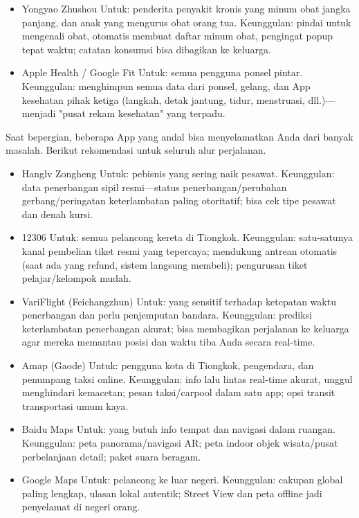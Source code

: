 
\begin{itemize}
  \item Yongyao Zhushou Untuk: penderita penyakit kronis yang minum obat jangka panjang, dan anak yang mengurus obat orang tua. Keunggulan: pindai untuk mengenali obat, otomatis membuat daftar minum obat, pengingat popup tepat waktu; catatan konsumsi bisa dibagikan ke keluarga.
\end{itemize}


\begin{itemize}
  \item Apple Health / Google Fit Untuk: semua pengguna ponsel pintar. Keunggulan: menghimpun semua data dari ponsel, gelang, dan App kesehatan pihak ketiga (langkah, detak jantung, tidur, menstruasi, dll.)—menjadi "pusat rekam kesehatan" yang terpadu.
\end{itemize}


Saat bepergian, beberapa App yang andal bisa menyelamatkan Anda dari banyak masalah. Berikut rekomendasi untuk seluruh alur perjalanan.


\begin{itemize}
  \item Hanglv Zongheng Untuk: pebisnis yang sering naik pesawat. Keunggulan: data penerbangan sipil resmi—status penerbangan/perubahan gerbang/peringatan keterlambatan paling otoritatif; bisa cek tipe pesawat dan denah kursi.
  \item 12306 Untuk: semua pelancong kereta di Tiongkok. Keunggulan: satu-satunya kanal pembelian tiket resmi yang tepercaya; mendukung antrean otomatis (saat ada yang refund, sistem langsung membeli); pengurusan tiket pelajar/kelompok mudah.
  \item VariFlight (Feichangzhun) Untuk: yang sensitif terhadap ketepatan waktu penerbangan dan perlu penjemputan bandara. Keunggulan: prediksi keterlambatan penerbangan akurat; bisa membagikan perjalanan ke keluarga agar mereka memantau posisi dan waktu tiba Anda secara real-time.
\end{itemize}


\begin{itemize}
  \item Amap (Gaode) Untuk: pengguna kota di Tiongkok, pengendara, dan penumpang taksi online. Keunggulan: info lalu lintas real-time akurat, unggul menghindari kemacetan; pesan taksi/carpool dalam satu app; opsi transit transportasi umum kaya.
  \item Baidu Maps Untuk: yang butuh info tempat dan navigasi dalam ruangan. Keunggulan: peta panorama/navigasi AR; peta indoor objek wisata/pusat perbelanjaan detail; paket suara beragam.
  \item Google Maps Untuk: pelancong ke luar negeri. Keunggulan: cakupan global paling lengkap, ulasan lokal autentik; Street View dan peta offline jadi penyelamat di negeri orang.
\end{itemize}

